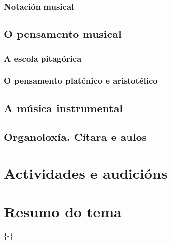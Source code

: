 \documentclass[a4paper, twoside]{templates/ociamthesis}
\begin{document}
\hypertarget{notaciuxf3n-musical}{%
\subsubsection{Notación musical}\label{notaciuxf3n-musical}}

\hypertarget{o-pensamento-musical}{%
\subsection{O pensamento musical}\label{o-pensamento-musical}}

\hypertarget{a-escola-pitaguxf3rica}{%
\subsubsection{A escola pitagórica}\label{a-escola-pitaguxf3rica}}

\hypertarget{o-pensamento-platuxf3nico-e-aristotuxe9lico}{%
\subsubsection{O pensamento platónico e aristotélico}\label{o-pensamento-platuxf3nico-e-aristotuxe9lico}}

\hypertarget{a-muxfasica-instrumental}{%
\subsection{A música instrumental}\label{a-muxfasica-instrumental}}

\hypertarget{organoloxuxeda.-cuxedtara-e-aulos}{%
\subsection{Organoloxía. Cítara e aulos}\label{organoloxuxeda.-cuxedtara-e-aulos}}

\hypertarget{actividades-e-audiciuxf3ns-2}{%
\section*{Actividades e audicións}\label{actividades-e-audiciuxf3ns-2}}

\hypertarget{resumo-do-tema}{%
\section{Resumo do tema}\label{resumo-do-tema}}

\{-\}
\end{document}

